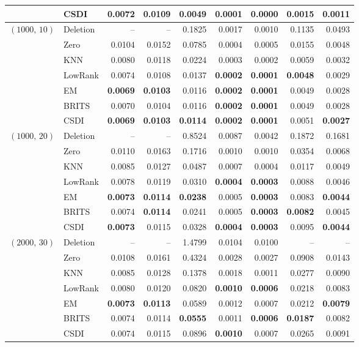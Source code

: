 \begin{table}[p]
\begin{tabular}{llrrrrrrr}
     & CSDI & \textbf{0.0072} & \textbf{0.0109} & 0.0049 & \textbf{0.0001} & \textbf{0.0000} & 0.0015 & \textbf{0.0011} \\
    \midrule
    $(1000,\, 10)$ & Deletion & -- & -- & 0.1825 & 0.0017 & 0.0010 & 0.1135 & 0.0493 \\
     & Zero & 0.0104 & 0.0152 & 0.0785 & 0.0004 & 0.0005 & 0.0155 & 0.0048 \\
     & KNN & 0.0080 & 0.0118 & 0.0224 & 0.0003 & 0.0002 & 0.0059 & 0.0032 \\
     & LowRank & 0.0074 & 0.0108 & 0.0137 & \textbf{0.0002} & \textbf{0.0001} & \textbf{0.0048} & 0.0029 \\
     & EM & \textbf{0.0069} & \textbf{0.0103} & 0.0116 & \textbf{0.0002} & \textbf{0.0001} & 0.0049 & 0.0028 \\
     & BRITS & 0.0070 & 0.0104 & 0.0116 & \textbf{0.0002} & \textbf{0.0001} & 0.0049 & 0.0028 \\
     & CSDI & \textbf{0.0069} & \textbf{0.0103} & \textbf{0.0114} & \textbf{0.0002} & \textbf{0.0001} & 0.0051 & \textbf{0.0027} \\
    \midrule
    $(1000,\, 20)$ & Deletion & -- & -- & 0.8524 & 0.0087 & 0.0042 & 0.1872 & 0.1681 \\
     & Zero & 0.0110 & 0.0163 & 0.1716 & 0.0010 & 0.0010 & 0.0354 & 0.0068 \\
     & KNN & 0.0085 & 0.0127 & 0.0487 & 0.0007 & 0.0004 & 0.0117 & 0.0049 \\
     & LowRank & 0.0078 & 0.0119 & 0.0310 & \textbf{0.0004} & \textbf{0.0003} & 0.0088 & 0.0046 \\
     & EM & \textbf{0.0073} & \textbf{0.0114} & \textbf{0.0238} & 0.0005 & \textbf{0.0003} & 0.0083 & \textbf{0.0044} \\
     & BRITS & 0.0074 & \textbf{0.0114} & 0.0241 & 0.0005 & \textbf{0.0003} & \textbf{0.0082} & 0.0045 \\
     & CSDI & \textbf{0.0073} & 0.0115 & 0.0328 & \textbf{0.0004} & \textbf{0.0003} & 0.0095 & \textbf{0.0044} \\
    \midrule
    $(2000,\, 30)$ & Deletion & -- & -- & 1.4799 & 0.0104 & 0.0100 & -- & -- \\
     & Zero & 0.0108 & 0.0161 & 0.4324 & 0.0028 & 0.0027 & 0.0908 & 0.0143 \\
     & KNN & 0.0085 & 0.0128 & 0.1378 & 0.0018 & 0.0011 & 0.0277 & 0.0090 \\
     & LowRank & 0.0080 & 0.0120 & 0.0820 & \textbf{0.0010} & \textbf{0.0006} & 0.0218 & 0.0083 \\
     & EM & \textbf{0.0073} & \textbf{0.0113} & 0.0589 & 0.0012 & 0.0007 & 0.0212 & \textbf{0.0079} \\
     & BRITS & 0.0074 & 0.0114 & \textbf{0.0555} & 0.0011 & \textbf{0.0006} & \textbf{0.0187} & 0.0082 \\
     & CSDI & 0.0074 & 0.0115 & 0.0896 & \textbf{0.0010} & 0.0007 & 0.0265 & 0.0091 \\
    \bottomrule
  \end{tabular}
\end{table}

